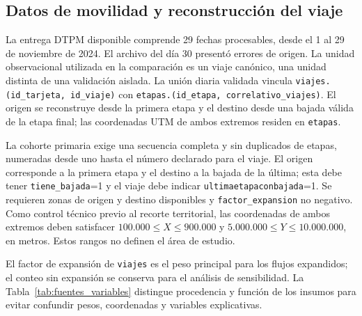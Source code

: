 \subsection{Datos de movilidad y reconstrucción del viaje}
\label{sec:ingesta_datos}

La entrega DTPM disponible comprende 29 fechas procesables, desde el 1 al 29 de noviembre de 2024. El archivo del día 30 presentó errores de origen. La unidad observacional utilizada en la comparación es un viaje canónico, una unidad distinta de una validación aislada. La unión diaria validada vincula \texttt{viajes.(id\_tarjeta, id\_viaje)} con \texttt{etapas.(id\_etapa, correlativo\_viajes)}. El origen se reconstruye desde la primera etapa y el destino desde una bajada válida de la etapa final; las coordenadas UTM de ambos extremos residen en \texttt{etapas}.

La cohorte primaria exige una secuencia completa y sin duplicados de etapas, numeradas desde uno hasta el número declarado para el viaje. El origen corresponde a la primera etapa y el destino a la bajada de la última; esta debe tener \texttt{tiene\_bajada}=1 y el viaje debe indicar \texttt{ultimaetapaconbajada}=1. Se requieren zonas de origen y destino disponibles y \texttt{factor\_expansion} no negativo. Como control técnico previo al recorte territorial, las coordenadas de ambos extremos deben satisfacer $100.000 \leq X \leq 900.000$ y $5.000.000 \leq Y \leq 10.000.000$, en metros. Estos rangos no definen el área de estudio.

El factor de expansión de \texttt{viajes} es el peso principal para los flujos expandidos; el conteo sin expansión se conserva para el análisis de sensibilidad. La Tabla~\ref{tab:fuentes_variables} distingue procedencia y función de los insumos para evitar confundir pesos, coordenadas y variables explicativas.

